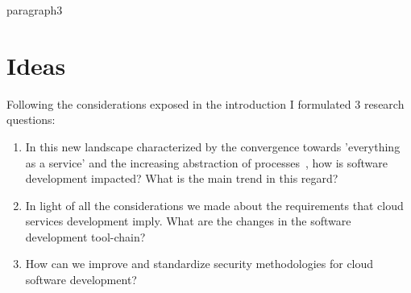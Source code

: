 \documentclass[a4paper, 10pt, conference]{ieeeconf}
\begin{document}
paragraph3


\section{Ideas}

Following the considerations exposed in the introduction I formulated 3 research questions:

\begin{enumerate}
 	\item In this new landscape characterized by the convergence towards 'everything as a service' and the increasing abstraction of processes~\cite{automatic-dev}, how is software development impacted? What is the main trend in this regard?
 	\item In light of all the considerations we made about the requirements that cloud services development imply. What are the changes in the software development tool-chain? 
	\item How can we improve and standardize security methodologies for cloud software development?
\end{enumerate}





\end{document}
